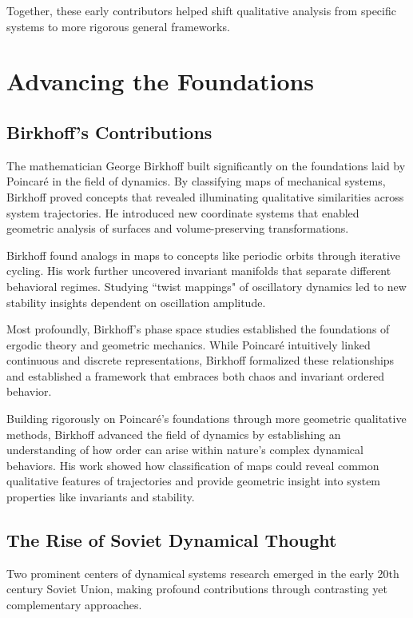 Together, these early contributors helped shift qualitative analysis from specific systems to more rigorous general frameworks.

\section{Advancing the Foundations}

\subsection{Birkhoff's Contributions}

The mathematician George Birkhoff built significantly on the foundations laid by Poincaré in the field of dynamics. By classifying maps of mechanical systems, Birkhoff proved concepts that revealed illuminating qualitative similarities across system trajectories. He introduced new coordinate systems that enabled geometric analysis of surfaces and volume-preserving transformations.

Birkhoff found analogs in maps to concepts like periodic orbits through iterative cycling. His work further uncovered invariant manifolds that separate different behavioral regimes. Studying ``twist mappings" of oscillatory dynamics led to new stability insights dependent on oscillation amplitude.

Most profoundly, Birkhoff's phase space studies established the foundations of ergodic theory and geometric mechanics. While Poincaré intuitively linked continuous and discrete representations, Birkhoff formalized these relationships and established a framework that embraces both chaos and invariant ordered behavior.

Building rigorously on Poincaré's foundations through more geometric qualitative methods, Birkhoff advanced the field of dynamics by establishing an understanding of how order can arise within nature's complex dynamical behaviors. His work showed how classification of maps could reveal common qualitative features of trajectories and provide geometric insight into system properties like invariants and stability.

\subsection{The Rise of Soviet Dynamical Thought}

Two prominent centers of dynamical systems research emerged in the early 20th century Soviet Union, making profound contributions through contrasting yet complementary approaches.

